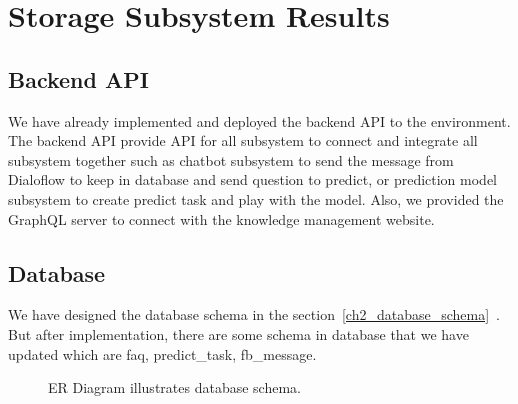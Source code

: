 \documentclass[12pt,oneside,openright,a4paper]{cpe-english-project}
\begin{document}
\pagebreak
\section{Storage Subsystem Results}
\subsection{Backend API}
We have already implemented and deployed the backend API to the environment.
The backend API provide API for all subsystem to connect and integrate all subsystem together such as
chatbot subsystem to send the message from Dialoflow to keep in database and send question to predict,
or prediction model subsystem to create predict task and play with the model.
Also, we provided the GraphQL server to connect with the knowledge management website.

\subsection{Database}
We have designed the database schema in the section~\ref*{ch2_database_schema}~.
But after implementation, there are some schema in database that we have updated which are
faq, predict\_task, fb\_message.

\begin{figure}[!h]\centering
{}
\caption{ER Diagram illustrates database schema.
}\label{fig:ER Diagram illustrates database schema in result.}
\end{figure}
\end{document}
